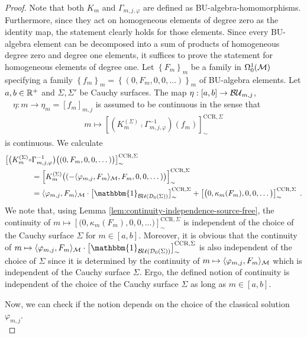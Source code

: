 \begin{proof}
	Note that both $K_m$ and $\Gamma_{m,j,\varphi}$ are defined as BU-algebra-homomorphisms. Furthermore, since they act on homogeneous elements of degree zero as the identity map, the statement clearly holds for those elements. Since every BU-algebra element can be decomposed into a sum of products of homogeneous degree zero and degree one elements, it suffices to prove the statement for homogeneous elements of degree one.
	Let $\left\{ F_m\right\}_m$ be a family in $\Omega^1_0(\mathcal{M})$ specifying a family $\left\{ f_m\right\}_m= \left\{(0, F_m,0,0,\dots)\right\}_m$ of BU-algebra elements. Let $a,b \in \mathbb{R}^+$ and $\Sigma, \Sigma'$ be Cauchy surfaces. The map $\eta: [a,b] \to {\mathcal{BU}_{m,j}}$, $\quad \eta : m\to \eta_m = [f_m]_{m,j}$ is assumed to be continuous in the sense that
\begin{align}
	m \mapsto  \left[ \left( K^{(\Sigma)}_m \comp \Gamma^{-1}_{m,j,\varphi} \right) (f_m) \right]_\sim^{\text{CCR}, \Sigma}
\end{align}
is continuous. We calculate
\begin{align}
\big[ \big( K^{(\Sigma)}_m \comp &\Gamma^{-1}_{m,j,\varphi} \big) \big( (0,F_m,0,0,\dots) \big) \big]_\sim^{\text{CCR}, \Sigma} \notag\\
&=  \left[  K^{(\Sigma)}_m  \big( (-\langle \varphi_{m,j},F_m\rangle_\M,F_m,0,0,\dots) \big) \right]_\sim^{\text{CCR}, \Sigma} \notag\\
&=  \langle \varphi_{m,j} , F_m \rangle_\M \cdot \big[  \mathbbm{1}_{\BU(\Dzs)} \big]_\sim^{\text{CCR}, \Sigma}   + \left[ \big(0,\kappa_m(F_m),0,0,\dots\big) \right]_\sim^{\text{CCR}, \Sigma} \formspace.
\end{align}
We note that, using Lemma \ref{lem:continuity-independence-source-free}, the continuity of $m \mapsto  \left[ \big(0,\kappa_m(F_m),0,0,\dots\big) \right]_\sim^{\text{CCR}, \Sigma}$ is independent of the choice of the Cauchy surface $\Sigma$ for $m \in [a,b]$. Moreover, it is obvious that the continuity of $m \mapsto \langle \varphi_{m,j} , F_m \rangle_\M \cdot \big[  \mathbbm{1}_{\BU(\Dzs)} \big]_\sim^{\text{CCR}, \Sigma} $ is also independent of the choice of $\Sigma$ since it is determined by the continuity of $m \mapsto \langle \varphi_{m,j} , F_m \rangle_{\mathcal{M}}$ which is independent of the Cauchy surface $\Sigma$. Ergo, the defined notion of continuity is independent of the choice of the Cauchy surface $\Sigma$ as long as $m \in [a,b]$.\par
%
Now, we can check if the notion depends on the choice of the classical solution $\varphi_{m,j}$. \\

\end{proof}
